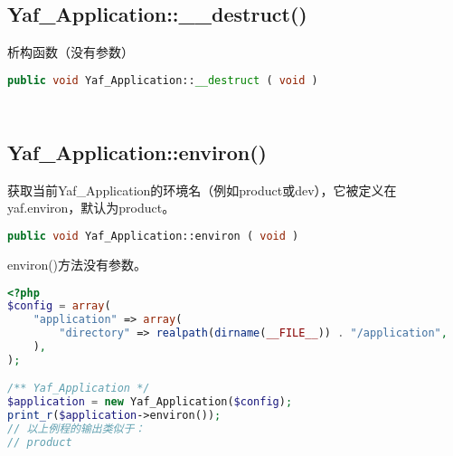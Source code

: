 \begin{lstlisting}[language=PHP]

\end{lstlisting}


\subsection{Yaf\_Application::\_\_destruct()}

析构函数（没有参数）






\begin{lstlisting}[language=PHP]
public void Yaf_Application::__destruct ( void )
\end{lstlisting}



\begin{lstlisting}[language=PHP]

\end{lstlisting}



\begin{lstlisting}[language=PHP]

\end{lstlisting}


\subsection{Yaf\_Application::environ()}

获取当前Yaf\_Application的环境名（例如product或dev），它被定义在yaf.environ，默认为product。






\begin{lstlisting}[language=PHP]
public void Yaf_Application::environ ( void )
\end{lstlisting}

environ()方法没有参数。

\begin{lstlisting}[language=PHP]
<?php
$config = array(
    "application" => array(
        "directory" => realpath(dirname(__FILE__)) . "/application",
    ),
);

/** Yaf_Application */
$application = new Yaf_Application($config);
print_r($application->environ());
// 以上例程的输出类似于：
// product
\end{lstlisting}




